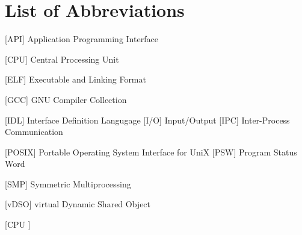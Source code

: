 
\chapter*{List of Abbreviations}

\begin{acronym} [CPU ]
 [API] {Application Programming Interface}


 [CPU] {Central Processing Unit}


 [ELF] {Executable and Linking Format}


 [GCC] {GNU Compiler Collection}


 [IDL] {Interface Definition Langugage}
 [I/O] {Input/Output}
[IPC] {Inter-Process Communication}







 [POSIX] {Portable Operating System Interface for UniX}
 [PSW] {Program Status Word}



 [SMP] {Symmetric Multiprocessing}



 [vDSO] {virtual Dynamic Shared Object}





\end{acronym} [CPU ]
